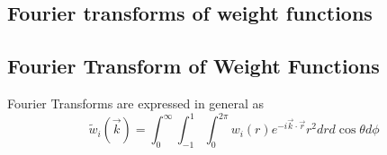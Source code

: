 \documentclass[letterpaper,twocolumn,amsmath,amssymb,prb]{revtex4-1}
\begin{document}
\appendix
\begin{widetext}
  \section{Fourier transforms of weight functions}\label{sec:fourier}

\subsection{Fourier Transform of Weight Functions}
Fourier Transforms are expressed in general as
\begin{equation}{\widetilde{w}_i(\vec{k})=\int_{0}^{\infty}\int_{-1}^{1}\int_{0}^{2\pi}w_i(r)e^{-i\vec{k}\cdot{\vec{r}}}r^2d{r}d{\cos\theta}d{\phi}}\end{equation}


\end{widetext}
\end{document}
